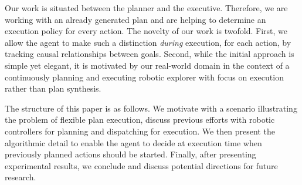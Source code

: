 Our work is situated between the planner and the executive. Therefore,
we are working with an already generated plan and are helping to determine
an execution policy for every action. 
The novelty of our work is twofold. First, we allow the agent to make
such a distinction \emph{during} execution, for each action, by
tracking causal relationships between goals. Second, while the initial
approach is simple yet elegant, it is motivated by our real-world
domain in the context of a continuously planning and executing robotic
explorer with focus on execution rather than plan synthesis.


The structure of this paper is as follows. We motivate with a
scenario illustrating the problem of flexible plan execution, discuss
previous efforts with robotic controllers for planning and dispatching
for execution. We then present the algorithmic detail to enable the
agent to decide at execution time when previously planned actions 
should be started. Finally, after presenting experimental results, 
we conclude and discuss potential directions for future research.

